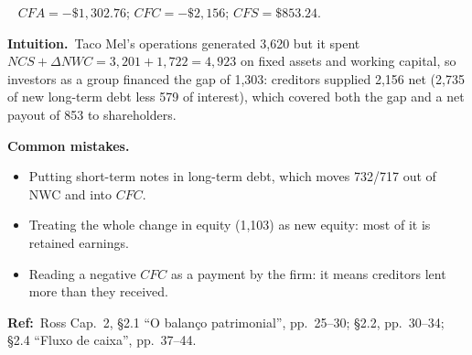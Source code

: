 \documentclass[11pt,a4paper]{article}
\newcommand{\intuition}{\par\medskip\noindent\textbf{Intuition.}~}
\newcommand{\refbib}{\par\smallskip\noindent\textbf{Ref:}~}
\newcommand{\answer}[1]{\par\smallskip\noindent\fbox{\textbf{Answer #1.}}~}
\newcommand{\pitfalls}{\par\medskip\noindent\textbf{Common mistakes.}}
\begin{document}
\answer{(26)} $CFA = -\$1{,}302.76$; $CFC = -\$2{,}156$; $CFS = \$853.24$.

\intuition Taco Mel's operations generated 3,620 but it spent $NCS + \Delta NWC = 3{,}201 + 1{,}722
= 4{,}923$ on fixed assets and working capital, so investors as a group financed the gap of 1,303:
creditors supplied 2,156 net (2,735 of new long-term debt less 579 of interest), which covered both
the gap and a net payout of 853 to shareholders.

\pitfalls
\begin{itemize}
  \item Putting short-term notes in long-term debt, which moves 732/717 out of NWC and into $CFC$.
  \item Treating the whole change in equity (1,103) as new equity: most of it is retained earnings.
  \item Reading a negative $CFC$ as a payment by the firm: it means creditors lent more than they received.
\end{itemize}

\refbib Ross Cap.~2, \S2.1 ``O balan\c{c}o patrimonial'', pp.~25--30; \S2.2, pp.~30--34;
\S2.4 ``Fluxo de caixa'', pp.~37--44.
\end{document}
